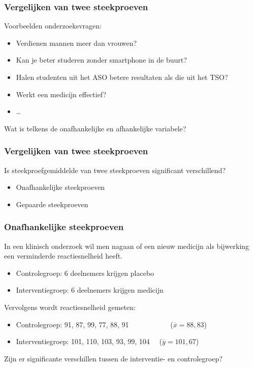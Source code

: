 \documentclass[aspectratio=169]{beamer}
\begin{document}
\begin{frame}
  \frametitle{Vergelijken van twee steekproeven}

  Voorbeelden onderzoeksvragen:

  \begin{itemize}
    \item Verdienen mannen meer dan vrouwen?
    \item Kan je beter studeren zonder smartphone in de buurt?
    \item Halen studenten uit het ASO betere resultaten als die uit het TSO?
    \item Werkt een medicijn effectief?
    \item \ldots
  \end{itemize}

  Wat is telkens de onafhankelijke en afhankelijke variabele?
\end{frame}

\begin{frame}
  \frametitle{Vergelijken van twee steekproeven}

  Is steekproefgemiddelde van twee steekproeven significant verschillend?

  \begin{itemize}
    \item Onafhankelijke steekproeven
    \item Gepaarde steekproeven
  \end{itemize}
\end{frame}

\begin{frame}
  \frametitle{Onafhankelijke steekproeven}

  In een klinisch onderzoek wil men nagaan of een nieuw medicijn als bijwerking een verminderde reactiesnelheid heeft.

  \begin{itemize}
    \item Controlegroep: 6 deelnemers krijgen placebo
    \item Interventiegroep: 6 deelnemers krijgen medicijn
  \end{itemize}

  \pause

  Vervolgens wordt reactiesnelheid gemeten:

  \begin{itemize}
    \item Controlegroep: 91, 87, 99, 77, 88, 91 ~~~~~~~~~~~($\overline{x}=88,83$)
    \item Interventiegroep: 101, 110, 103, 93, 99, 104 ~~($\overline{y}=101,67$)
  \end{itemize}

  Zijn er significante verschillen tussen de interventie- en controlegroep?
\end{frame}
\end{document}
